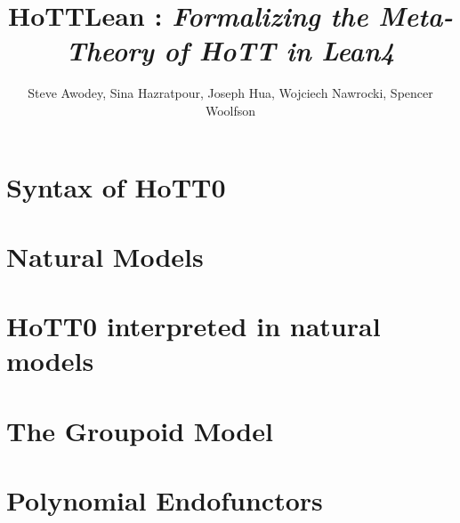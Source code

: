 
\title{HoTTLean : { \it Formalizing the Meta-Theory of HoTT in Lean4} }
\author{Steve Awodey, Sina Hazratpour, Joseph Hua,
  Wojciech Nawrocki, Spencer Woolfson}


\maketitle

\chapter{Syntax of HoTT0}

\chapter{Natural Models}

\chapter{HoTT0 interpreted in natural models}

\chapter{The Groupoid Model}

\chapter{Polynomial Endofunctors}


{}



